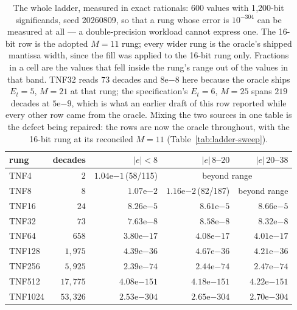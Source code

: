 \documentclass[11pt]{article}
\theoremstyle{definition}
\begin{document}
\begin{table}[t]\centering
\caption{The whole ladder, measured in exact rationals: 600 values with
1{,}200-bit significands, seed 20260809, so that a rung whose error is
$10^{-304}$ can be measured at all --- a double-precision workload cannot express
one. The 16-bit row is the adopted $M{=}11$ rung; every wider rung is the oracle's
shipped mantissa width, since the fill was applied to the 16-bit rung only.
Fractions in a cell are the values that fell inside the rung's range out of the
values in that band. TNF32 reads $73$ decades and $8\mathrm{e}{-8}$ here because
the oracle ships $E_t{=}5$, $M{=}21$ at that rung; the specification's
$E_t{=}6$, $M{=}25$ spans $219$ decades at $5\mathrm{e}{-9}$, which is what an
earlier draft of this row reported while every other row came from the oracle.
Mixing the two sources in one table is the defect being repaired: the rows are now
the oracle throughout, with the 16-bit rung at its reconciled $M{=}11$
(Table~\ref{tab:ladder-sweep}).}
\label{tab:ladderacc}
\begin{tabular}{lrrrr}
\toprule
rung & decades & $|e|<8$ & $|e|\,8$--$20$ & $|e|\,20$--$38$ \\
\midrule
TNF4    & $2$      & $1.04\mathrm{e}{-1}$\,(58/115) & \multicolumn{2}{c}{beyond range} \\
TNF8    & $8$      & $1.07\mathrm{e}{-2}$ & $1.16\mathrm{e}{-2}$\,(82/187) & beyond range \\
TNF16   & $24$     & $8.26\mathrm{e}{-5}$   & $8.61\mathrm{e}{-5}$   & $8.66\mathrm{e}{-5}$ \\
TNF32   & $73$     & $7.63\mathrm{e}{-8}$   & $8.58\mathrm{e}{-8}$   & $8.32\mathrm{e}{-8}$ \\
TNF64   & $658$    & $3.80\mathrm{e}{-17}$  & $4.08\mathrm{e}{-17}$  & $4.01\mathrm{e}{-17}$ \\
TNF128  & $1{,}975$  & $4.39\mathrm{e}{-36}$  & $4.67\mathrm{e}{-36}$  & $4.21\mathrm{e}{-36}$ \\
TNF256  & $5{,}925$  & $2.39\mathrm{e}{-74}$  & $2.44\mathrm{e}{-74}$  & $2.47\mathrm{e}{-74}$ \\
TNF512  & $17{,}775$ & $4.08\mathrm{e}{-151}$ & $4.18\mathrm{e}{-151}$ & $4.22\mathrm{e}{-151}$ \\
TNF1024 & $53{,}326$ & $2.53\mathrm{e}{-304}$ & $2.65\mathrm{e}{-304}$ & $2.70\mathrm{e}{-304}$ \\
\bottomrule
\end{tabular}
\end{table}
\end{document}
